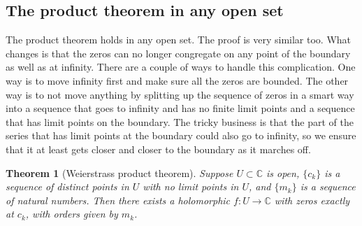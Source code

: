\documentclass[12pt,openany]{book}
\newcommand{\C}{{\mathbb{C}}}
\theoremstyle{plain}
\newtheorem{thm}{Theorem}[section]
\theoremstyle{remark}
\theoremstyle{definition}
\theoremstyle{exercise}
\theoremstyle{example}
\begin{document}
\subsection{The product theorem in any open set}

The product theorem holds in any open set.  The proof is very similar too.
What changes is that the zeros can no longer congregate on any point of
the boundary as well as at infinity.  There are a couple of ways to handle
this complication.
One way is to move infinity first and make sure all the zeros are bounded.
The other way is to not move anything by splitting up the sequence of zeros in a
smart way into a sequence that goes to infinity and has no finite limit
points and a sequence that has limit points on the boundary.  The tricky
business is that the part of the series that has limit points at the
boundary could also go to infinity, so we ensure that it at least gets
closer and closer to the boundary as it marches off.

\begin{thm}[Weierstrass product theorem]
\label{thm:weierprod}
Suppose $U \subset \C$ is open, $\{ c_k \}$ is
a sequence of distinct points in $U$
with no limit points in $U$, and $\{ m_k \}$ is a sequence of
natural numbers.
Then there exists a holomorphic $f \colon U \to \C$ with
zeros exactly at $c_k$, with orders given by $m_k$.
\end{thm}
\end{document}
